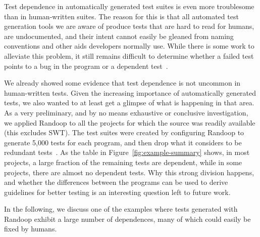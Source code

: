 \newcommand{\pub}{\texttt{Prop\-er\-ty\-Utils\-Bean}}
\newcommand{\fhm}{\texttt{Fast\-Hash\-Map}}
\newcommand{\cub}{\texttt{ConvertUtilsBean}}

Test dependence in automatically generated test suites is 
even more troublesome than in human-written suites. The reason for this is
that all automated test generation tools we are aware of produce tests
that are hard to read for humans, are undocumented, and their intent
cannot easily be gleaned from naming conventions and other aids
developers normally use. While there is some work to alleviate this problem, it
still remains difficult to determine whether a failed test points to a bug
in the program or a dependent test~\cite{fraseretal:ISSTA:2011}.

We already showed some evidence that test dependence is not uncommon
in human-written tests. Given the increasing importance of
automatically generated tests, we also wanted to at least get a
glimpse of what is happening in that area.
As a very preliminary, and by no means exhaustive or conclusive
investigation, we applied Randoop to all the projects for which the
source was readily available (this excludes SWT).
The test suites were created by configuring Randoop to generate 5,000 tests
for each program, and then drop what it considers to be redundant
tests~\cite{PachecoLET2007}.
As the table in Figure~\ref{fig:example-summary} shows, in most
projects, a large fraction of the remaining tests are dependent, while
in some projects, there are almost no dependent tests.
Why this strong division happens, and whether the differences between
the programs can be used to derive guidelines for better testing is an
interesting question left to future work.


In the following, we discuss one of the examples where tests generated with
Randoop exhibit a large number of dependences, many of which could easily be
fixed by humans.


